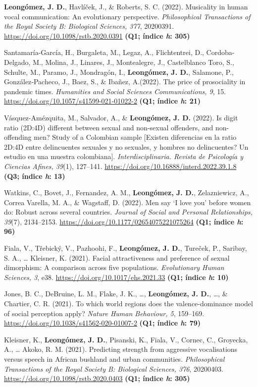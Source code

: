 \documentclass[11pt,a4paper,]{awesome-cv}
\begin{document}
\textbf{Leongómez, J. D.}, Havlíček, J., \& Roberts, S. C. (2022).
Musicality in human vocal communication: An evolutionary perspective.
\emph{Philosophical Transactions of the Royal Society B: Biological
Sciences, 377}, 20200391. \url{https://doi.org/10.1098/rstb.2020.0391}
\textbf{(Q1; índice \emph{h}: 305)}

Santamaría-García, H., Burgaleta, M., Legaz, A., Flichtentrei, D.,
Cordoba-Delgado, M., Molina, J., Linares, J., Montealegre, J.,
Castelblanco Toro, S., Schulte, M., Paramo, J., Mondragón, I.,
\textbf{Leongómez, J. D.}, Salamone, P., González‑Pacheco, J., Baez, S.,
\& Ibañez, A.(2022). The price of prosociality in pandemic times.
\emph{Humanities and Social Sciences Communications, 9}, 15.
\url{https://doi.org/10.1057/s41599-021-01022-2} \textbf{(Q1; índice
\emph{h}: 21)}

Vásquez-Amézquita, M., Salvador, A., \& \textbf{Leongómez, J. D.}
(2022). Is digit ratio (2D:4D) different between sexual and non-sexual
offenders, and non-offending men? Study of a Colombian sample {[}Existen
diferencias en la ratio 2D:4D entre delincuentes sexuales y no sexuales,
y hombres no delincuentes? Un estudio en una muestra colombiana{]}.
\emph{Interdisciplinaria. Revista de Psicología y Ciencias Afines,
39}(1), 127--141. \url{https://doi.org/10.16888/interd.2022.39.1.8}
\textbf{(Q3; índice \emph{h}: 13)}

Watkins, C., Bovet, J., Fernandez, A. M., \textbf{Leongómez, J. D.},
Zelazniewicz, A., Correa Varella, M. A., \& Wagstaff, D. (2022). Men say
`I love you' before women do: Robust across several countries.
\emph{Journal of Social and Personal Relationships, 39}(7), 2134--2153.
\url{https://doi.org/10.1177/02654075221075264} \textbf{(Q1; índice
\emph{h}: 96)}

Fiala, V., Třebický, V., Pazhoohi, F., \textbf{Leongómez, J. D.},
Tureček, P., Saribay, S. A., \ldots{} Kleisner, K. (2021). Facial
attractiveness and preference of sexual dimorphism: A comparison across
five populations. \emph{Evolutionary Human Sciences, 3}, e38.
\url{https://doi.org/10.1017/ehs.2021.33} \textbf{(Q1; índice \emph{h}:
10)}

Jones, B. C., DeBruine, L. M., Flake, J. K., \ldots,
\textbf{Leongómez, J. D.}, \ldots, \& Chartier, C. R. (2021). To which
world regions does the valence-dominance model of social perception
apply? \emph{Nature Human Behaviour, 5}, 159--169.
\url{https://doi.org/10.1038/s41562-020-01007-2} \textbf{(Q1; índice
\emph{h}: 79)}

Kleisner, K., \textbf{Leongómez, J. D.}, Pisanski, K., Fiala, V.,
Cornec, C., Groyecka, A., \ldots{} Akoko, R. M. (2021). Predicting
strength from aggressive vocalisations versus speech in African bushland
and urban communities. \emph{Philosophical Transactions of the Royal
Society B: Biological Sciences, 376}, 20200403.
\url{https://doi.org/10.1098/rstb.2020.0403} \textbf{(Q1; índice
\emph{h}: 305)}
\end{document}
